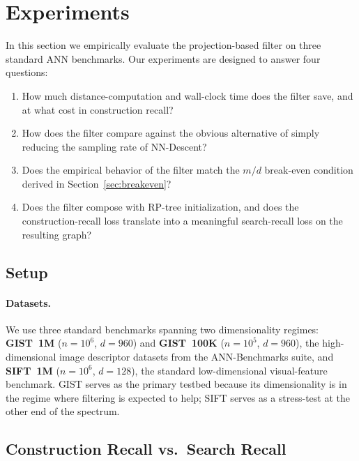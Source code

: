 \section{Experiments}
\label{sec:experiments}

In this section we empirically evaluate the projection-based filter on three standard ANN benchmarks.
Our experiments are designed to answer four questions:
\begin{enumerate}[label=(Q\arabic*),leftmargin=*]
    \item How much distance-computation and wall-clock time does the filter save, and at what cost in construction recall?
    \item How does the filter compare against the obvious alternative of simply reducing the sampling rate of NN-Descent?
    \item Does the empirical behavior of the filter match the $m/d$ break-even condition derived in Section~\ref{sec:breakeven}?
    \item Does the filter compose with RP-tree initialization, and does the construction-recall loss translate into a meaningful search-recall loss on the resulting graph?
\end{enumerate}


\subsection{Setup}
\label{sec:setup}

\paragraph{Datasets.}
We use three standard benchmarks spanning two dimensionality regimes:
\textbf{GIST~1M} ($n=10^6$, $d=960$) and \textbf{GIST~100K} ($n=10^5$, $d=960$), the high-dimensional image descriptor datasets from the ANN-Benchmarks suite, and
\textbf{SIFT~1M} ($n=10^6$, $d=128$), the standard low-dimensional visual-feature benchmark.
GIST serves as the primary testbed because its dimensionality is in the regime where filtering is expected to help; SIFT serves as a stress-test at the other end of the spectrum.

\subsection{Construction Recall vs.\ Search Recall}
\label{sec:construction_recall}

